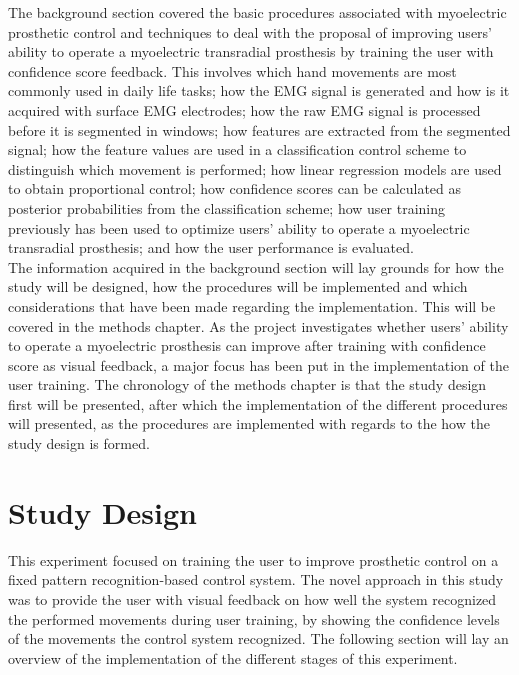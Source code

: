 The background section covered the basic procedures associated with myoelectric prosthetic control and techniques to deal with the proposal of improving users' ability to operate a myoelectric transradial prosthesis by training the user with confidence score feedback. This involves which hand movements are most commonly used in daily life tasks; how the EMG signal is generated and how is it acquired with surface EMG electrodes; how the raw EMG signal is processed before it is segmented in windows; how features are extracted from the segmented signal; how the feature values are used in a classification control scheme to distinguish which movement is performed; how linear regression models are used to obtain proportional control; how confidence scores can be calculated as posterior probabilities from the classification scheme; how user training previously has been used to optimize users' ability to operate a myoelectric transradial prosthesis; and how the user performance is evaluated. \\
The information acquired in the background section will lay grounds for how the study will be designed, how the procedures will be implemented and which considerations that have been made regarding the implementation. This will be covered in the methods chapter. As the project investigates whether users' ability to operate a myoelectric prosthesis can improve after training with confidence score as visual feedback, a major focus has been put in the implementation of the user training. The chronology of the methods chapter is that the study design first will be presented, after which the implementation of the different procedures will presented, as the procedures are implemented with regards to the how the study design is formed. 



\section{Study Design} \label{sec:M:studyDesign}

This experiment focused on training the user to improve prosthetic control on a fixed pattern recognition-based control system. The novel approach in this study was to provide the user with visual feedback on how well the system recognized the performed movements during user training, by showing the confidence levels of the movements the control system recognized. The following section will lay an overview of the implementation of the different stages of this experiment.

